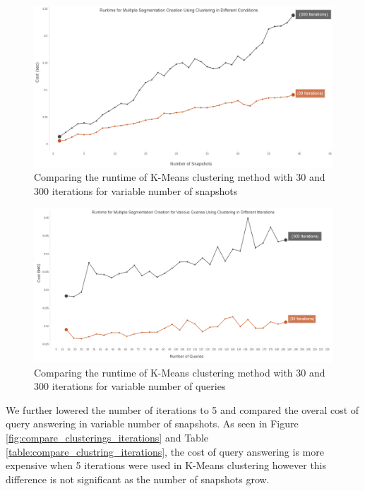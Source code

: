 			\begin{figure}
				\centering
				\includegraphics[width=\textwidth]{figs/multiSnap_clustering.jpg}
				\caption{Comparing the runtime of K-Means clustering method with 30 and 300 iterations for variable number of snapshots}
				\label{fig:clustering_comparison_multiSnap}
			\end{figure} 

			\begin{figure}
				\centering
				\includegraphics[width=\textwidth]{figs/multiQuery_clustering.jpg}
				\caption{Comparing the runtime of K-Means clustering method with 30 and 300 iterations for variable number of queries}
				\label{fig:clustering_comparison_multiQuery}
			\end{figure} 

			We further lowered the number of iterations to 5 and compared the overal cost of query answering in variable number of snapshots. As seen in Figure \ref{fig:compare_clusterings_iterations} and Table \ref{table:compare_clustring_iterations}, the cost of query answering is more expensive when 5 iterations were used in K-Means clustering however this difference is not significant as the number of snapshots grow.

